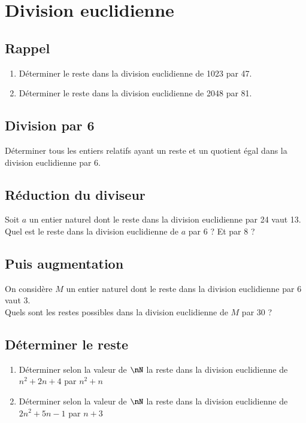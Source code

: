\documentclass[oneside,12pt]{article}          %
\begin{document}
\section{Division euclidienne}

\subsection{Rappel}
\begin{enumerate}
	\item Déterminer le reste dans la division euclidienne de 1023 par 47.
	\item Déterminer le reste dans la division euclidienne de 2048 par 81.
\end{enumerate}



\subsection{Division par 6}
Déterminer tous les entiers relatifs ayant un reste et un quotient égal dans la division euclidienne par 6.



\subsection{Réduction du diviseur}
Soit $a$ un entier naturel dont le reste dans la division euclidienne par 24 vaut 13.\\
Quel est le reste dans la division euclidienne de $a$ par 6 ? Et par 8 ?



\subsection{Puis augmentation}
On considère $M$ un entier naturel dont le reste dans la division euclidienne par 6 vaut 3.\\
Quels sont les restes possibles dans la division euclidienne de $M$ par 30 ?



\subsection{Déterminer le reste}
\begin{enumerate}
	\item Déterminer selon la valeur de $\nN$ la reste dans la division euclidienne de $n^2+2n+4$ par $n^2+n$
	\item Déterminer selon la valeur de $\nN$ la reste dans la division euclidienne de $2n^2+5n-1$ par $n+3$ 
\end{enumerate}
\end{document}
